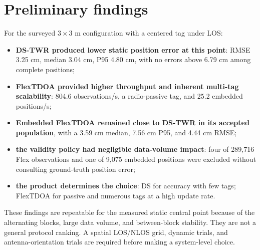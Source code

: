 \documentclass[11pt,a4paper]{article}
\begin{document}
\section{Preliminary findings}

For the surveyed $3\times3$ m configuration with a centered tag under LOS:

\begin{itemize}[leftmargin=6mm]
  \item \textbf{DS-TWR produced lower static position error at this point}:
  RMSE 3.25 cm, median 3.04 cm, P95 4.80 cm, with no errors above 6.79 cm
  among complete positions;
  \item \textbf{FlexTDOA provided higher throughput and inherent multi-tag
  scalability}: 804.6
  observations/s, a radio-passive tag, and 25.2 embedded positions/s;
  \item \textbf{Embedded FlexTDOA remained close to DS-TWR in its accepted
  population}, with a 3.59 cm median, 7.56 cm P95, and 4.44 cm RMSE;
  \item \textbf{the validity policy had negligible data-volume impact}: four
  of 289,716 Flex observations and one of 9,075 embedded positions were
  excluded without consulting ground-truth position error;
  \item \textbf{the product determines the choice}: DS for accuracy with few
  tags; FlexTDOA for passive and numerous tags at a high update rate.
\end{itemize}

These findings are repeatable for the measured static central point because of
the alternating blocks, large data volume, and between-block stability. They
are not a general protocol ranking. A spatial LOS/NLOS grid, dynamic trials,
and antenna-orientation trials are required before making a system-level
choice.

\clearpage
\appendix
\end{document}
